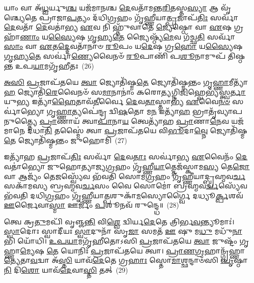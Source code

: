 {\anuvakamend[{𑌓𑌷᳴𑌧𑍀\-\ul{𑌭𑍍𑌯}\-𑌶𑍍𑌚𑌤𑍁᳴𑌰𑍍𑌦𑌶 𑌚}]}%

𑌯𑌾𑌂 𑌵𑌾 𑌅᳴\-\ul{𑌧𑍍𑌵}\-𑌰𑍍𑌯𑍁\-\ul{𑌶𑍍𑌚} 𑌯𑌜᳴𑌮𑌾𑌨𑌶𑍍𑌚 \ul{𑌦𑍇}\-𑌵𑌤𑌾᳴𑌮𑌨𑍍𑌤\-\ul{𑌰𑌿}\-𑌤𑌸𑍍𑌤\-\ul{𑌸𑍍𑌯𑌾} 𑌆 𑌵𑍃᳴𑌶𑍍𑌚𑍍𑌯𑍇𑌤𑍇 𑌪𑍍𑌰𑌾𑌜𑌾\-\ul{𑌪}\-𑌤𑍍𑌯𑌂 𑌦᳴𑌧𑌿\-\ul{𑌗𑍍𑌰}\-𑌹𑌂 𑌗𑍃᳴𑌹𑍍𑌣𑍀𑌯𑌾\-\ul{𑌤𑍍𑌪𑍍𑌰}\-𑌜𑌾𑌪᳴\-\ul{𑌤𑌿𑌃} 𑌸𑌰𑍍𑌵𑌾᳴ \ul{𑌦𑍇}\-𑌵𑌤𑌾᳴ \ul{𑌦𑍇}\-𑌵𑌤𑌾॑𑌭𑍍𑌯 \ul{𑌏}\-𑌵 𑌨𑌿 𑌹𑍍𑌨𑍁᳴𑌵𑌾𑌤𑍇 \ul{𑌜𑍍𑌯𑍇}\-𑌷𑍍𑌠𑍋 𑌵𑌾 \ul{𑌏}\-𑌷 𑌗𑍍𑌰𑌹𑌾᳴\-\ul{𑌣𑌾𑌂} 𑌯\-\ul{𑌸𑍍𑌯𑍈}\-𑌷 \ul{𑌗𑍃}\-𑌹𑍍𑌯\-\ul{𑌤𑍇} 𑌜𑍍𑌯𑍈𑌷𑍍𑌠𑍍𑌯᳴\-\ul{𑌮𑍇}\-𑌵 𑌗᳴𑌚𑍍𑌛\-\ul{𑌤𑌿} 𑌸𑌰𑍍𑌵𑌾᳴\-\ul{𑌸𑌾𑌂} 𑌵𑌾 \ul{𑌏}\-𑌤\-\ul{𑌦𑍍𑌦𑍇}\-𑌵𑌤𑌾᳴𑌨𑌾𑍞 \ul{𑌰𑍂}\-𑌪𑌂 𑌯\-\ul{𑌦𑍇}\-𑌷 𑌗𑍍𑌰\-\ul{𑌹𑍋} 𑌯\-\ul{𑌸𑍍𑌯𑍈}\-𑌷 \ul{𑌗𑍃}\-𑌹𑍍𑌯\-\ul{𑌤𑍇} 𑌸𑌰𑍍𑌵𑌾॑\-\ul{𑌣𑍍𑌯𑍇}\-𑌵𑍈𑌨𑍞᳴ \ul{𑌰𑍂}\-𑌪𑌾𑌣𑌿᳴ 𑌪\-\ul{𑌶𑍂}\-𑌨𑌾𑌮𑍁𑌪᳴ 𑌤𑌿𑌷𑍍𑌠𑌨𑍍𑌤 𑌉𑌪\-\ul{𑌯𑌾}\-𑌮𑌗𑍃᳴𑌹𑍀𑌤𑌃~(26)

\-\ul{𑌅}\-\-\ul{𑌸𑌿} \ul{𑌪𑍍𑌰}\-𑌜𑌾𑌪᳴𑌤𑌯𑍇 \ul{𑌤𑍍𑌵𑌾} 𑌜𑍍𑌯𑍋𑌤𑌿᳴𑌷𑍍𑌮\-\ul{𑌤𑍇} 𑌜𑍍𑌯𑍋𑌤𑌿᳴𑌷𑍍𑌮𑌨𑍍𑌤𑌂 𑌗𑍃\-\ul{𑌹𑍍𑌣𑌾}\-𑌮𑍀𑌤𑍍𑌯𑌾᳴\-\ul{𑌹} 𑌜𑍍𑌯𑍋𑌤𑌿᳴\-\ul{𑌰𑍇}\-𑌵𑍈𑌨𑍞᳴ 𑌸\-\ul{𑌮𑌾}\-𑌨𑌾𑌨𑌾𑌂॑ 𑌕𑌰𑍋𑌤𑍍𑌯𑌗𑍍𑌨𑌿\-\ul{𑌜𑌿}\-𑌹𑍍𑌵𑍇𑌭𑍍𑌯᳴𑌸𑍍𑌤𑍍𑌵\-\ul{𑌰𑍍𑌤𑌾}\-𑌯𑍁\-\ul{𑌭𑍍𑌯} 𑌇𑌤𑍍𑌯𑌾᳴\-\ul{𑌹𑍈}\-𑌤𑌾𑌵᳴\-\ul{𑌤𑍀}\-𑌰𑍍𑌵𑍈 \ul{𑌦𑍇}\-𑌵\-\ul{𑌤𑌾}\-𑌸𑍍𑌤𑌾𑌭𑍍𑌯᳴ \ul{𑌏}\-𑌵𑍈\-\ul{𑌨}\-\-\ul{𑍞} 𑌸𑌰𑍍𑌵𑌾॑𑌭𑍍𑌯𑍋 𑌗𑍃\-\ul{𑌹𑍍𑌣𑌾}\-𑌤𑍍𑌯𑌪𑍇॑𑌨𑍍𑌦𑍍𑌰 𑌦𑍍𑌵𑌿\-\ul{𑌷}\-𑌤𑍋 𑌮\-\ul{𑌨} 𑌇𑌤𑍍𑌯𑌾᳴\-\ul{𑌹} 𑌭𑍍𑌰𑌾𑌤𑍃᳴𑌵𑍍𑌯𑌾𑌪𑌨𑍁𑌤𑍍𑌤𑍍𑌯𑍈 \ul{𑌪𑍍𑌰𑌾}\-𑌣𑌾𑌯᳴ 𑌤𑍍𑌵𑌾\-\ul{𑌪𑌾}\-𑌨𑌾\-\ul{𑌯} 𑌤𑍍𑌵𑍇𑌤𑍍𑌯𑌾᳴𑌹 \ul{𑌪𑍍𑌰𑌾}\-𑌣𑌾\-\ul{𑌨𑍇}\-𑌵 𑌯𑌜᳴𑌮𑌾𑌨𑍇 𑌦𑌧𑌾\-\ul{𑌤𑌿} 𑌤𑌸𑍍𑌮𑍈॑ 𑌤𑍍𑌵𑌾 \ul{𑌪𑍍𑌰}\-𑌜𑌾𑌪᳴𑌤𑌯𑍇 𑌵𑌿\-\ul{𑌭𑍂}\-𑌦𑌾\-\ul{𑌵𑍍𑌨𑍇} 𑌜𑍍𑌯𑍋𑌤𑌿᳴𑌷𑍍𑌮\-\ul{𑌤𑍇} 𑌜𑍍𑌯𑍋𑌤𑌿᳴𑌷𑍍𑌮𑌨𑍍𑌤𑌂 𑌜𑍁𑌹𑍋𑌮𑌿~(27)

𑌇𑌤𑍍𑌯𑌾᳴𑌹 \ul{𑌪𑍍𑌰}\-𑌜𑌾𑌪᳴\-\ul{𑌤𑌿𑌃} 𑌸𑌰𑍍𑌵𑌾᳴ \ul{𑌦𑍇}\-𑌵\-\ul{𑌤𑌾𑌃} 𑌸𑌰𑍍𑌵𑌾॑𑌭𑍍𑌯 \ul{𑌏}\-𑌵𑍈𑌨𑌂᳴ \ul{𑌦𑍇}\-𑌵𑌤𑌾॑𑌭𑍍𑌯𑍋 𑌜𑍁𑌹𑍋𑌤𑍍𑌯𑌾𑌜𑍍𑌯\-\ul{𑌗𑍍𑌰}\-𑌹𑌂 𑌗𑍃᳴𑌹𑍍𑌣𑍀\-\ul{𑌯𑌾}\-𑌤𑍍𑌤𑍇𑌜᳴𑌸𑍍𑌕𑌾𑌮\-\ul{𑌸𑍍𑌯} 𑌤𑍇\-\ul{𑌜𑍋} 𑌵𑌾 𑌆𑌜𑍍𑌯𑌂᳴ 𑌤𑍇\-\ul{𑌜}\-𑌸𑍍𑌵𑍍𑌯𑍇᳴𑌵 𑌭᳴𑌵𑌤𑌿 𑌸𑍋𑌮\-\ul{𑌗𑍍𑌰}\-𑌹𑌂 𑌗𑍃᳴𑌹𑍍𑌣𑍀𑌯𑌾𑌦𑍍𑌬𑍍𑌰𑌹𑍍𑌮𑌵\-\ul{𑌰𑍍𑌚}\-𑌸𑌕𑌾᳴𑌮𑌸𑍍𑌯 𑌬𑍍𑌰𑌹𑍍𑌮𑌵\-\ul{𑌰𑍍𑌚}\-𑌸𑌂 𑌵𑍈 𑌸𑍋𑌮𑍋॑ 𑌬𑍍𑌰𑌹𑍍𑌮𑌵\-\ul{𑌰𑍍𑌚}\-𑌸𑍍𑌯𑍇᳴𑌵 𑌭᳴𑌵𑌤𑌿 𑌦𑌧𑌿\-\ul{𑌗𑍍𑌰}\-𑌹𑌂 𑌗𑍃᳴𑌹𑍍𑌣𑍀𑌯𑌾\-\ul{𑌤𑍍𑌪}\-𑌶𑍁𑌕𑌾᳴\-\ul{𑌮}\-𑌸𑍍𑌯𑍋𑌰𑍍𑌗𑍍𑌵𑍈 𑌦𑌧𑍍𑌯𑍂\-\ul{𑌰𑍍𑌕𑍍𑌪}\-𑌶𑌵᳴ \ul{𑌊}\-𑌰𑍍𑌜𑍈𑌵𑌾\-\ul{𑌸𑍍𑌮𑌾} 𑌊𑌰𑍍𑌜𑌂᳴ \ul{𑌪}\-𑌶𑍂𑌨𑌵᳴ 𑌰𑍁𑌨𑍍𑌦𑍍𑌧𑍇॥~(28)

{\anuvakamend[{\-\ul{𑌉}\-\-\ul{𑌪}\-\-\ul{𑌯𑌾}\-𑌮𑌗𑍃᳴𑌹𑍀𑌤𑍋 𑌜𑍁𑌹𑍋\-\ul{𑌮𑌿} 𑌤𑍍𑌰𑌿𑌚᳴𑌤𑍍𑌵𑌾𑌰𑌿𑍞𑌶𑌚𑍍𑌚}]}%

𑌤𑍍𑌵𑍇 𑌕𑍍𑌰\-\ul{𑌤𑍁}\-𑌮𑌪𑌿᳴ 𑌵𑍃𑌞𑍍𑌜\-\ul{𑌨𑍍𑌤𑌿} 𑌵𑌿\-\ul{𑌶𑍍𑌵𑍇} 𑌦𑍍𑌵𑌿𑌰𑍍𑌯\-\ul{𑌦𑍇}\-𑌤𑍇 𑌤𑍍𑌰𑌿𑌰𑍍𑌭\-\ul{𑌵}\-𑌨𑍍𑌤𑍍𑌯𑍂𑌮𑌾𑌃॑। \ul{𑌸𑍍𑌵𑌾}\-𑌦𑍋𑌃 𑌸𑍍𑌵𑌾𑌦𑍀᳴𑌯𑌃 \ul{𑌸𑍍𑌵𑌾}\-𑌦𑍁𑌨𑌾᳴ 𑌸𑍃\-\ul{𑌜𑌾} 𑌸𑌮𑌤᳴ \ul{𑌊} 𑌷𑍁 𑌮\-\ul{𑌧𑍁} 𑌮𑌧𑍁᳴\-\ul{𑌨𑌾}\-𑌭𑌿 𑌯𑍋᳴𑌧𑌿। \ul{𑌉}\-\-\ul{𑌪}\-\-\ul{𑌯𑌾}\-𑌮𑌗𑍃᳴𑌹𑍀𑌤𑍋\-𑌽𑌸𑌿 \ul{𑌪𑍍𑌰}\-𑌜𑌾𑌪᳴𑌤𑌯𑍇 \ul{𑌤𑍍𑌵𑌾} 𑌜𑍁𑌷𑍍𑌟𑌂᳴ 𑌗𑍃𑌹𑍍𑌣𑌾\-\ul{𑌮𑍍𑌯𑍇}\-𑌷 \ul{𑌤𑍇} 𑌯𑍋𑌨𑌿𑌃᳴ \ul{𑌪𑍍𑌰}\-𑌜𑌾𑌪᳴𑌤𑌯𑍇 𑌤𑍍𑌵𑌾। \ul{𑌪𑍍𑌰𑌾}\-\-\ul{𑌣}\-\-\ul{𑌗𑍍𑌰}\-𑌹𑌾𑌨𑍍𑌗𑍃᳴𑌹𑍍𑌣𑌾\-\ul{𑌤𑍍𑌯𑍇}\-𑌤𑌾\-\ul{𑌵}\-𑌦𑍍𑌵𑌾 𑌅᳴\-\ul{𑌸𑍍𑌤𑌿} 𑌯𑌾𑌵᳴\-\ul{𑌦𑍇}\-𑌤𑍇 𑌗𑍍𑌰\-\ul{𑌹𑌾𑌃} 𑌸𑍍𑌤𑍋\-\ul{𑌮𑌾}\-𑌶𑍍𑌛𑌨𑍍𑌦𑌾𑍞᳴𑌸𑌿 \ul{𑌪𑍃}\-𑌷𑍍𑌠𑌾\-\ul{𑌨𑌿} 𑌦𑌿\-\ul{𑌶𑍋} 𑌯𑌾𑌵᳴\-\ul{𑌦𑍇}\-𑌵𑌾\-\ul{𑌸𑍍𑌤𑌿} 𑌤𑌤𑍍~(29)

